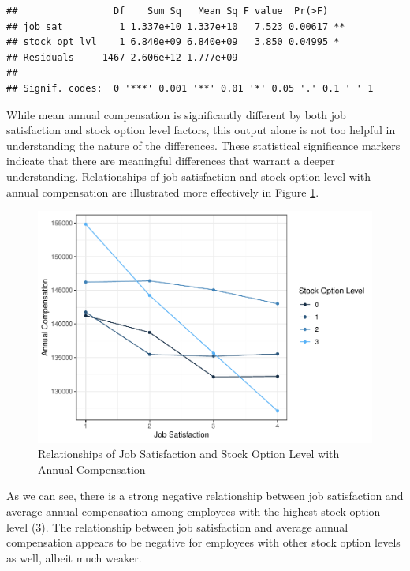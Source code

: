 \documentclass[]{book}
\begin{document}
\begin{verbatim}
##                 Df    Sum Sq   Mean Sq F value  Pr(>F)   
## job_sat          1 1.337e+10 1.337e+10   7.523 0.00617 **
## stock_opt_lvl    1 6.840e+09 6.840e+09   3.850 0.04995 * 
## Residuals     1467 2.606e+12 1.777e+09                   
## ---
## Signif. codes:  0 '***' 0.001 '**' 0.01 '*' 0.05 '.' 0.1 ' ' 1
\end{verbatim}

While mean annual compensation is significantly different by both job satisfaction and stock option level factors, this output alone is not too helpful in understanding the nature of the differences. These statistical significance markers indicate that there are meaningful differences that warrant a deeper understanding. Relationships of job satisfaction and stock option level with annual compensation are illustrated more effectively in Figure \ref{fig:two-way-factorial}.

\begin{figure}

{\centering \includegraphics[width=1\linewidth]{The_People_Analytics_Companion_files/figure-latex/two-way-factorial-1} 

}

\caption{Relationships of Job Satisfaction and Stock Option Level with Annual Compensation}\label{fig:two-way-factorial}
\end{figure}

As we can see, there is a strong negative relationship between job satisfaction and average annual compensation among employees with the highest stock option level (3). The relationship between job satisfaction and average annual compensation appears to be negative for employees with other stock option levels as well, albeit much weaker.
\end{document}
